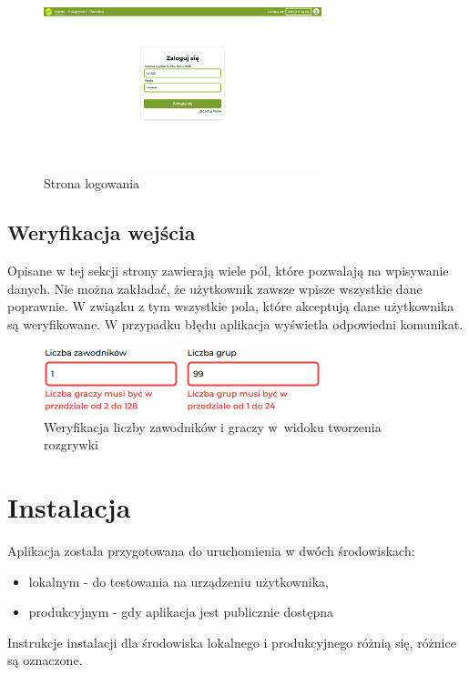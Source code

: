 \documentclass[shortabstract]{iithesis}
\begin{document}
\begin{figure}[H]
    \centering
    \includegraphics[width=0.72\textwidth,valign=t]{assets/interfejs/logowanie_desktop.png}
    \caption{Strona logowania}
\end{figure}

\subsection{Weryfikacja wejścia}
Opisane w tej sekcji strony zawierają wiele pól, które pozwalają na wpisywanie danych.
Nie można zakładać, że użytkownik zawsze wpisze wszystkie dane poprawnie.
W związku z tym wszystkie pola, które akceptują dane użytkownika są weryfikowane.
W przypadku błędu aplikacja wyświetla odpowiedni komunikat.
\begin{figure}[H]
    \centering
    \includegraphics[width=0.72\textwidth,valign=t]{assets/interfejs/weryfikacja_wejscia.png}
    \caption{Weryfikacja liczby zawodników i graczy w~widoku tworzenia rozgrywki}
\end{figure}

\section{Instalacja}
\noindent
Aplikacja została przygotowana do uruchomienia w dwóch środowiskach:
\begin{itemize}
    \item lokalnym - do testowania na urządzeniu użytkownika,
    \item produkcyjnym - gdy aplikacja jest publicznie dostępna
\end{itemize}
Instrukcje instalacji dla środowiska lokalnego i produkcyjnego różnią się, różnice są oznaczone.
\end{document}
